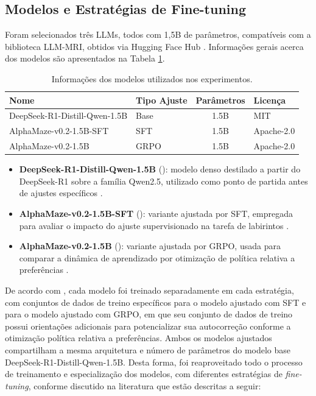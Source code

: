 \subsection{Modelos e Estratégias de Fine-tuning}

Foram selecionados três LLMs, todos com 1,5B de parâmetros, compatíveis com a biblioteca LLM-MRI, obtidos via Hugging Face Hub \cite{hf-hugging-face-hub-2025}. Informações gerais acerca dos modelos são apresentados na Tabela \ref{tab:modelos-utilizados}.
\begin{table}[h!]
    \centering
    \caption{Informações dos modelos utilizados nos experimentos.}
    \label{tab:modelos-utilizados}
    \begin{tabular}{|l|l|c|l|}
        \hline
        Nome & Tipo Ajuste & Parâmetros & Licença \\
        \hline
        DeepSeek-R1-Distill-Qwen-1.5B & Base & 1.5B & MIT \\
        AlphaMaze-v0.2-1.5B-SFT & SFT & 1.5B & Apache-2.0 \\
        AlphaMaze-v0.2-1.5B & GRPO & 1.5B & Apache-2.0 \\
        \hline
    \end{tabular}
\end{table}

\begin{itemize}
    \item \textbf{DeepSeek-R1-Distill-Qwen-1.5B} (\cite{hf-deepseek-r1-dq-1p5b}): modelo denso destilado a partir do DeepSeek-R1 sobre a família Qwen2.5, utilizado como ponto de partida antes de ajustes específicos \cite{hf-deepseek-r1-dq-1p5b}.
    \item \textbf{AlphaMaze-v0.2-1.5B-SFT} (\cite{hf-jan-alpha-sft-1p5b}): variante ajustada por SFT, empregada para avaliar o impacto do ajuste supervisionado na tarefa de labirintos \cite{hf-jan-alpha-sft-1p5b}.
    \item \textbf{AlphaMaze-v0.2-1.5B} (\cite{hf-menlo-alphamaze-v02-1p5b}): variante ajustada por GRPO, usada para comparar a dinâmica de aprendizado por otimização de política relativa a preferências \cite{hf-menlo-alphamaze-v02-1p5b, dao2025alphamaze}.
\end{itemize}

De acordo com \cite{dao2025alphamaze}, cada modelo foi treinado separadamente em cada estratégia, com conjuntos de dados de treino específicos para o modelo ajustado com SFT e para o modelo ajustado com GRPO, em que seu conjunto de dados de treino possui orientações adicionais para potencializar sua autocorreção conforme a otimização política relativa a preferências. Ambos os modelos ajustados compartilham a mesma arquitetura e número de parâmetros do modelo base DeepSeek-R1-Distill-Qwen-1.5B. Desta forma, foi reaproveitado todo o processo de treinamento e especialização dos modelos, com diferentes estratégias de \textit{fine-tuning}, conforme discutido na literatura que estão descritas a seguir:

